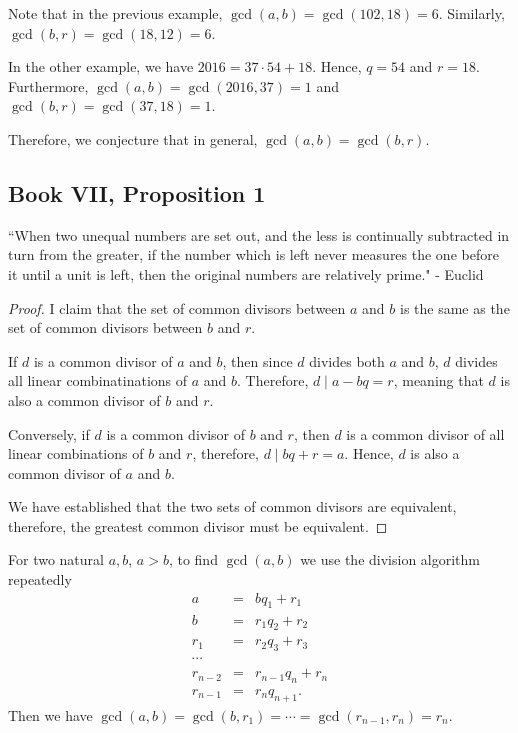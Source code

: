 Note that in the previous example, $\gcd(a,b)=\gcd(102, 18)=6$. Similarly, $\gcd(b, r)=\gcd(18, 12)=6$. 

In the other example, we have $2016=37\cdot 54+18$. Hence, $q=54$ and $r=18$. Furthermore, $\gcd(a,b)=\gcd(2016, 37)=1$ and $\gcd(b,r)=\gcd(37, 18)=1$. 

Therefore, we conjecture that in general, $\gcd(a,b)=\gcd(b,r).$ 
\clearpage

\subsection{Book VII, Proposition 1}

\begin{displayquote} ``When two unequal numbers are set out, and the less is continually subtracted in turn from the greater, if the number which is left never measures the one before it until a unit is left, then the original numbers are relatively prime." - Euclid \end{displayquote}


\clearpage

\begin{proof}

I claim that the set of common divisors between $a$ and $b$ is the same as the set of common divisors between $b$ and $r$.  

If $d$ is a common divisor of $a$ and $b$, then since $d$ divides both $a$ and $b$, $d$ divides all linear combinatinations of $a$ and $b$.  Therefore, $d\mid a-bq=r$, meaning that $d$ is also a common divisor of $b$ and $r$.  

Conversely, if $d$ is a common divisor of $b$ and $r$, then $d$ is a common divisor of all linear combinations of $b$ and $r$, therefore, $d\mid bq+r=a$.  Hence, $d$ is also a common divisor of $a$ and $b$.  

We have established that the two sets of common divisors are equivalent, therefore, the greatest common divisor must be equivalent.  \end{proof}

\clearpage

\begin{theorem}  For two natural $a,b$, $a>b$, to find $\gcd(a,b)$ we use the division algorithm repeatedly  \begin{eqnarray*}  a&=&bq_1+r_1 \\ b&=&r_1q_2+r_2 \\ r_1&=&r_2q_3+r_3 \\ \cdots \\ r_{n-2}&=&r_{n-1}q_n+r_n \\ r_{n-1}&=&r_nq_{n+1}. \end{eqnarray*}  
	Then we have $\gcd(a, b)=\gcd(b, r_1)=\cdots=\gcd(r_{n-1}, r_n)=r_n.$  \end{theorem}
\clearpage

